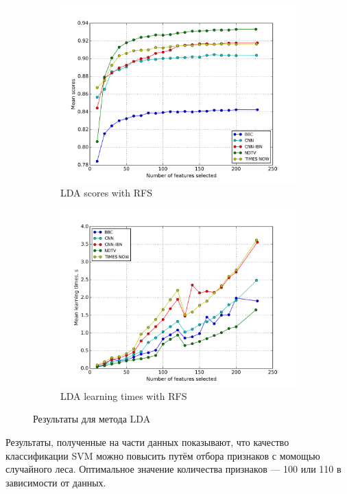 \begin{figure}[h!]
    \centering
	\begin{subfigure}{0.45\textwidth}
		\includegraphics[width=\textwidth]{images/RFS-LDA.png}
		\caption{LDA scores with RFS}
	\end{subfigure}
	\begin{subfigure}{0.45\textwidth}
		\includegraphics[width=\textwidth]{images/RFS-LDATime.png}
		\caption{LDA learning times with RFS}
	\end{subfigure}
	\caption{Результаты для метода LDA}\label{fig:lda_rfs}
\end{figure}

\par
Результаты, полученные на части данных показывают, что качество классификации SVM можно повысить путём отбора признаков с момощью случайного леса. Оптимальное значение количества признаков --- 100 или 110 в зависимости от данных.

